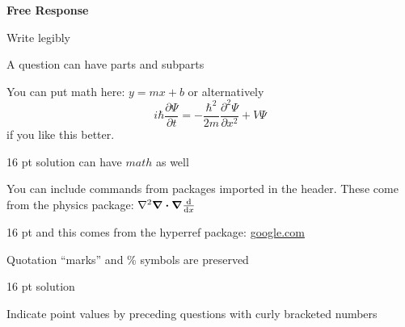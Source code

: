 \documentclass{exam}
\begin{document}
\newpage
\par\noindent \textbf{\large  Free Response}
\par\noindent  Write legibly
\begin{questions}
	\setcounter{question}{27}
	\question A question can have parts and subparts
	\question You can put math here: $y=mx+b$ or alternatively \[i\hbar \frac{\partial \Psi}{\partial t} = -\frac{\hbar^2}{2m}\frac{\partial^2 \Psi}{\partial x^2} + V \Psi\] if you like this better.
		\begin{solution}16 pt
		solution can have $math$ as well
		\end{solution}
	\question You can include commands from packages imported in the header. These come from the physics package: $\laplacian\div\grad\dv{x}$
		\begin{solution}16 pt
		and this comes from the hyperref package: \url{google.com}
		\end{solution}
	\question Quotation ``marks'' and \% symbols are preserved
		\begin{solution}16 pt
		solution
		\end{solution}
	\question[3]  Indicate point values by preceding questions with curly bracketed numbers
	\begin{parts}

\end{parts}
\end{questions}
\end{document}
